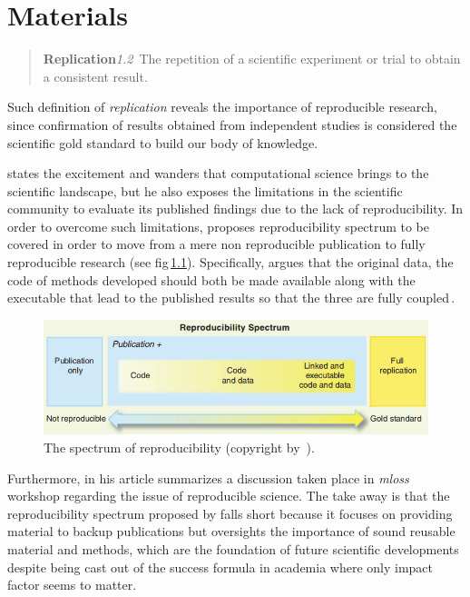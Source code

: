 \graphicspath{{4_materials/figures/}}
\chapter{Materials}\label{chap:4}

\begin{quote}
  \textbf{Replication}\quad \emph{1.2}~The repetition of a scientific
  experiment or trial to obtain a consistent result.
\end{quote}

Such definition of \emph{replication} reveals the importance of reproducible
research, since confirmation of results obtained from independent studies is
considered the scientific gold standard to build our body of knowledge.

\citeauthor{peng2011reproducible} states the excitement and wanders that
computational science brings to the scientific landscape, but he also exposes
the limitations in the scientific community to evaluate its published findings
due to the lack of reproducibility. In order to overcome such limitations,
\citeauthor{peng2011reproducible} proposes reproducibility spectrum to be
covered in order to move from a mere non reproducible publication to fully
reproducible research (see \acs{fig}\,\ref{fig:reproducibility_spectrum}).
Specifically, \citeauthor{peng2011reproducible} argues that the original data,
the code of methods developed should both be made available along with the
executable that lead to the published results so that the three are fully
coupled\,\cite{peng2011reproducible}.

\begin{figure}
\centering
\includegraphics[width=.50\textwidth]{reproducibility_spectrum}
\caption[The spectrum of reproducibility.]{The spectrum of reproducibility (copyright by~\cite{peng2011reproducible}).}
\label{fig:reproducibility_spectrum}
\end{figure}

Furthermore, \citeauthor{varoquaux2015Software} in his article
 summarizes a discussion taken place in
\emph{\acs{mloss}} workshop regarding the issue of reproducible science. The
take away is that the reproducibility spectrum proposed by
\citeauthor{peng2011reproducible} falls short because it focuses on providing material to
backup publications but oversights the importance of sound reusable material and
methods, which are the foundation of future scientific developments despite
being cast out of the success formula in academia where only impact factor seems
to matter.

